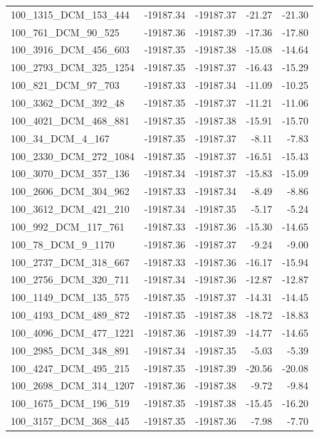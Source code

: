 \documentclass[journal=jacsat,manuscript=article]{achemso}
\begin{document}
\begin{table}[b!]
\begin{tabular}{lrrrr}
100\_1315\_DCM\_153\_444  & -19187.34 & -19187.37 &  -21.27 & -21.30 \\
100\_761\_DCM\_90\_525    & -19187.36 & -19187.39 &  -17.36 & -17.80 \\
100\_3916\_DCM\_456\_603  & -19187.35 & -19187.38 &  -15.08 & -14.64 \\
100\_2793\_DCM\_325\_1254 & -19187.35 & -19187.37 &  -16.43 & -15.29 \\
100\_821\_DCM\_97\_703    & -19187.33 & -19187.34 &  -11.09 & -10.25 \\
100\_3362\_DCM\_392\_48   & -19187.35 & -19187.37 &  -11.21 & -11.06 \\
100\_4021\_DCM\_468\_881  & -19187.35 & -19187.38 &  -15.91 & -15.70 \\
100\_34\_DCM\_4\_167      & -19187.35 & -19187.37 &   -8.11 &  -7.83 \\
100\_2330\_DCM\_272\_1084 & -19187.35 & -19187.37 &  -16.51 & -15.43 \\
100\_3070\_DCM\_357\_136  & -19187.34 & -19187.37 &  -15.83 & -15.09 \\
100\_2606\_DCM\_304\_962  & -19187.33 & -19187.34 &   -8.49 &  -8.86 \\
100\_3612\_DCM\_421\_210  & -19187.34 & -19187.35 &   -5.17 &  -5.24 \\
100\_992\_DCM\_117\_761   & -19187.33 & -19187.36 &  -15.30 & -14.65 \\
100\_78\_DCM\_9\_1170     & -19187.36 & -19187.37 &   -9.24 &  -9.00 \\
100\_2737\_DCM\_318\_667  & -19187.33 & -19187.36 &  -16.17 & -15.94 \\
100\_2756\_DCM\_320\_711  & -19187.34 & -19187.36 &  -12.87 & -12.87 \\
100\_1149\_DCM\_135\_575  & -19187.35 & -19187.37 &  -14.31 & -14.45 \\
100\_4193\_DCM\_489\_872  & -19187.35 & -19187.38 &  -18.72 & -18.83 \\
100\_4096\_DCM\_477\_1221 & -19187.36 & -19187.39 &  -14.77 & -14.65 \\
100\_2985\_DCM\_348\_891  & -19187.34 & -19187.35 &   -5.03 &  -5.39 \\
100\_4247\_DCM\_495\_215  & -19187.35 & -19187.39 &  -20.56 & -20.08 \\
100\_2698\_DCM\_314\_1207 & -19187.36 & -19187.38 &   -9.72 &  -9.84 \\
100\_1675\_DCM\_196\_519  & -19187.35 & -19187.38 &  -15.45 & -16.20 \\
100\_3157\_DCM\_368\_445  & -19187.35 & -19187.36 &   -7.98 &  -7.70 \\

\end{tabular}
\end{table}
\end{document}
